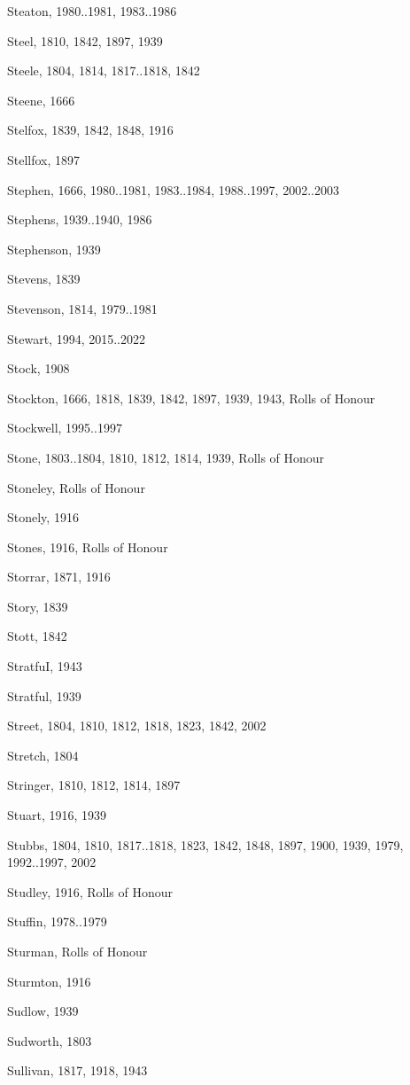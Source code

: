 {\begin{theindex}
\item Steaton, 1980..1981, 1983..1986
\item Steel, 1810, 1842, 1897, 1939
\item Steele, 1804, 1814, 1817..1818, 1842
\item Steene, 1666
\item Stelfox, 1839, 1842, 1848, 1916
\item Stellfox, 1897
\item Stephen, 1666, 1980..1981, 1983..1984, 1988..1997, 2002..2003
\item Stephens, 1939..1940, 1986
\item Stephenson, 1939
\item Stevens, 1839
\item Stevenson, 1814, 1979..1981
\item Stewart, 1994, 2015..2022
\item Stock, 1908
\item Stockton, 1666, 1818, 1839, 1842, 1897, 1939, 1943, Rolls of Honour
\item Stockwell, 1995..1997
\item Stone, 1803..1804, 1810, 1812, 1814, 1939, Rolls of Honour
\item Stoneley, Rolls of Honour
\item Stonely, 1916
\item Stones, 1916, Rolls of Honour
\item Storrar, 1871, 1916
\item Story, 1839
\item Stott, 1842
\item StratfuI, 1943
\item Stratful, 1939
\item Street, 1804, 1810, 1812, 1818, 1823, 1842, 2002
\item Stretch, 1804
\item Stringer, 1810, 1812, 1814, 1897
\item Stuart, 1916, 1939
\item Stubbs, 1804, 1810, 1817..1818, 1823, 1842, 1848, 1897, 1900, 1939, 1979, 1992..1997, 2002
\item Studley, 1916, Rolls of Honour
\item Stuffin, 1978..1979
\item Sturman, Rolls of Honour
\item Sturmton, 1916
\item Sudlow, 1939
\item Sudworth, 1803
\item Sullivan, 1817, 1918, 1943

\end{theindex}}
